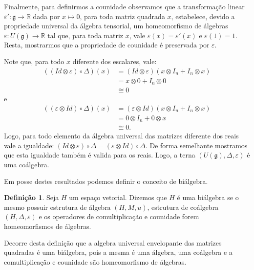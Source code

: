 \documentclass[twoside,openright,titlepage,numbers=noenddot,headinclude,  lineheaders footinclude=true,cleardoublepage=empty,
                                BCOR=5mm,paper=a4,fontsize=12pt ]{scrbook}
\theoremstyle{definition}
\newtheorem{definicao}{Definição}[chapter]
\begin{document}
Finalmente, para definirmos a counidade observamos que a transformação linear \mbox{$\varepsilon': 
\mathfrak{g} \rightarrow \mathbb{R} $} dada por $ x \mapsto 0$, para toda matriz 
quadrada $x$, estabelece, devido a propriedade universal da
álgebra tensorial, um homeomorfismo de álgebras
\mbox{$\varepsilon: U( \mathfrak{g} ) \rightarrow \mathbb{R}$} tal que, para toda matriz $x$, vale $\varepsilon(x) = \varepsilon'(x)$
e $\varepsilon(1) = 1$. Resta, mostrarmos
que a propriedade de counidade é preservada por $\varepsilon$. 

Note que, para todo $x$ 
diferente dos escalares, vale:
\begin{align*}
		((Id \otimes \varepsilon) \circ  \Delta) (x)  &= (Id \otimes \varepsilon) (x \otimes I_n + I_n \otimes x)\\
												&= x \otimes 0 + I_n \otimes 0\\
												& \cong 0
\end{align*}
e
\begin{align*}
		((\varepsilon \otimes Id) \circ \Delta ) (x)  &= (\varepsilon \otimes Id) (x \otimes I_n + I_n \otimes x)\\
												&= 0 \otimes I_n + 0 \otimes x\\
												& \cong 0.
\end{align*}
Logo, para todo elemento da álgebra universal das matrizes diferente dos reais vale a igualdade:
$ (Id \otimes \varepsilon) \circ \Delta = (\varepsilon \otimes Id) \circ \Delta$. De forma semelhante
mostramos que esta igualdade também é valida para os reais. Logo, a terna 
$( U(\mathfrak{g} ), \Delta, \varepsilon)$ é uma coálgebra.

Em posse destes resultados podemos definir o conceito de biálgebra.
\begin{definicao} 
Seja $H$ um espaço vetorial. Dizemos que $H$ é uma biálgebra se o mesmo possuir estrutura de álgebra
$(H, M, u)$, estrutura de coálgebra $(H, \Delta, \varepsilon)$ e os operadores de comultiplicação
e counidade forem homeomorfismos de álgebras.
\end{definicao}

Decorre desta definição que a algebra universal envelopante das matrizes quadradas é uma biálgebra,
pois a mesma é uma álgebra, uma coálgebra e a comultiplicação e counidade são homeomorfismo de álgebras.

\end{document}
